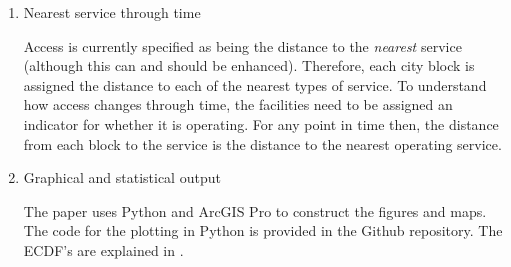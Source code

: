 \documentclass[onecolumn,doublespacing]{risa}
\let \cite \parencite
\begin{document}
\begin{enumerate}[listparindent=0em, parsep=0.5em,itemindent=0em]
    \item Nearest service through time
    
    Access is currently specified as being the distance to the \textit{nearest} service (although this can and should be enhanced). 
    Therefore, each city block is assigned the distance to each of the nearest types of service.
    To understand how access changes through time, the facilities need to be assigned an indicator for whether it is operating.
    For any point in time then, the distance from each block to the service is the distance to the nearest operating service.
    
    \item Graphical and statistical output
    
    The paper uses Python and ArcGIS Pro to construct the figures and maps. 
    The code for the plotting in Python is provided in the Github repository.
    The ECDF's are explained in \cite{Logan2017-fr}.
    
\end{enumerate}
\end{document}
